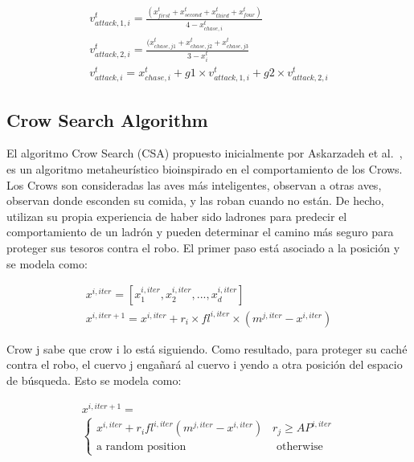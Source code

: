 \documentclass[conference]{IEEEtran}
\begin{document}
\begin{equation}
	\begin{gathered}
		v_{attack,1,i}^t = \frac{(x_{first}^t+x_{second}^t + x_{third}^t + x_{four}^t)}{4-x_{chase,i}^t} \\
		v_{attack,2,i}^t = \frac{(x_{chase,j1}^t+x_{chase,j2}^t + x_{chase,j3}^t}{3-x_{i}^t}  \\
		v_{attack,i}^t = x_{chase,i}^t+ g1 \times v_{attack,1,i}^t + g2 \times v_{attack,2,i}^t
	\end{gathered}
	\label{eq22}
\end{equation}

\subsection{Crow Search Algorithm}

\noindent El algoritmo Crow Search (CSA) propuesto inicialmente por Askarzadeh et al.~\cite{Askarzadeh2016}, es un algoritmo metaheurístico bioinspirado en el comportamiento de los Crows. Los Crows son consideradas las aves más inteligentes, observan a otras aves, observan donde esconden su comida, y las roban cuando no están. De hecho, utilizan su propia experiencia de haber sido ladrones para predecir el comportamiento de un ladrón y pueden determinar el camino más seguro para proteger sus tesoros contra el robo. El primer paso está asociado a la posición y se modela como:

\begin{equation}
	\begin{gathered}
		x^{i,iter} = [x_{1}^{i,iter}, x_{2}^{i,iter},...,x_{d}^{i,iter}]\\
		x^{i,iter+1}=x^{i,iter}+r_{i} \times fl^{i,iter} \times (m^{j,iter}-x^{i,iter})
	\end{gathered}
	\label{eq23}
\end{equation}

\noindent Crow j sabe que crow i lo está siguiendo. Como resultado, para proteger su caché contra el robo, el cuervo j engañará al cuervo i yendo a otra posición del espacio de búsqueda. Esto se modela como:

\begin{equation}
	\begin{gathered}
		x^{i,iter+1}=\\
		\begin{cases}
			x^{i,iter}+r_{i} fl^{i,iter} (m^{j,iter} - x^{i,iter}) \; \; \; r_j \geq AP^{i,iter}                                     \\
			\text{a random position} \; \; \; \; \; \;\; \; \;\; \; \;\;\; \; \;\;\; \; \; \; \;\;\; \; \;\; \; \;  \text{otherwise} 
		\end{cases}
	\end{gathered}
	\label{eq24}
\end{equation}
\end{document}
